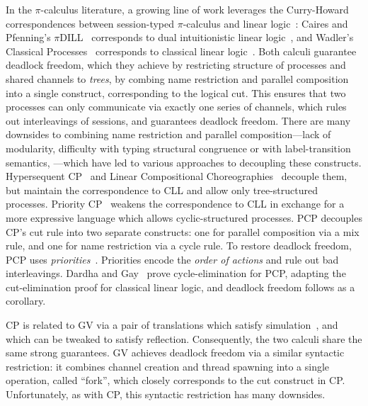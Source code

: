 \documentclass[main.tex]{subfiles}
\begin{document}
In the $\pi$-calculus literature, a growing line of work leverages the Curry-Howard correspondences between session-typed $\pi$-calculus and linear logic~\cite{girard87}: Caires and Pfenning's $\pi$DILL~\cite{cairespfenning10} corresponds to dual intuitionistic linear logic~\cite{barber96}, and Wadler's Classical Processes~\cite[CP]{wadler14} corresponds to classical linear logic~\cite[CLL]{girard87}. Both calculi guarantee deadlock freedom, which they achieve by restricting structure of processes and shared channels to \emph{trees}, by combing name restriction and parallel composition into a single construct, corresponding to the logical cut. This ensures that two processes can only communicate via exactly one series of channels, which rules out interleavings of sessions, and guarantees deadlock freedom.
There are many downsides to combining name restriction and parallel composition---lack of modularity, difficulty with typing structural congruence or with label-transition semantics, \etc---which have led to various approaches to decoupling these constructs. Hypersequent CP~\cite{MP18,kokkemontesi19popl,kokkemontesi19tlla} and Linear Compositional Choreographies~\cite{CarboneMS18} decouple them, but maintain the correspondence to CLL and allow only tree-structured processes. Priority CP~\cite[PCP]{dardhagay18} weakens the correspondence to CLL in exchange for a more expressive language which allows cyclic-structured processes. PCP decouples CP's cut rule into two separate constructs: one for parallel composition via a mix rule, and one for name restriction via a cycle rule. To restore deadlock freedom, PCP uses \emph{priorities}~\cite{kobayashi06,padovani14}. Priorities encode the \emph{order of actions} and rule out bad interleavings. Dardha and Gay~\cite{dardhagay18} prove cycle-elimination for PCP, adapting the cut-elimination proof for classical linear logic, and deadlock freedom follows as a corollary.

CP is related to GV via a pair of translations which satisfy simulation~\cite{lindleymorris16}, and which can be tweaked to satisfy reflection. Consequently, the two calculi share the same strong guarantees. GV achieves deadlock freedom via a similar syntactic restriction: it combines channel creation and thread spawning into a single operation, called ``fork'', which closely corresponds to the cut construct in CP. Unfortunately, as with CP, this syntactic restriction has many downsides.
\end{document}
